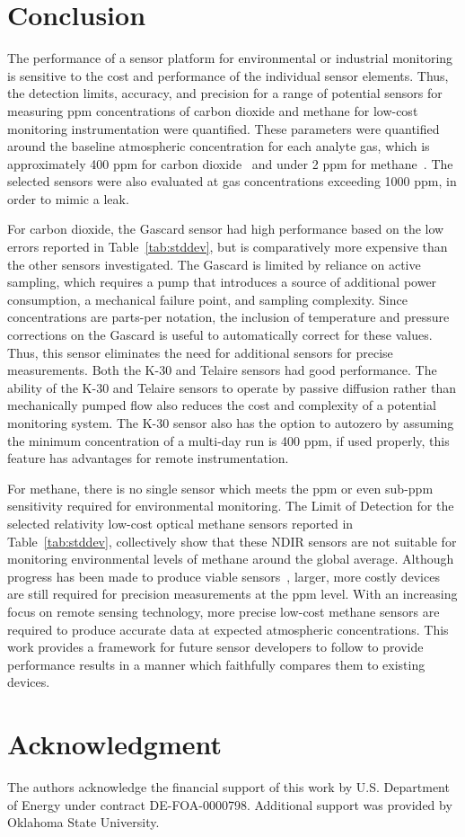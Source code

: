 \documentclass[preprint,sort&compress]{elsarticle}
\begin{document}
			\FloatBarrier	
	
	\section{Conclusion}
	
		The performance of a sensor platform for environmental or industrial monitoring is sensitive to the cost and performance of the individual sensor elements.  Thus, the detection limits, accuracy, and precision for a range of potential sensors for measuring ppm concentrations of carbon dioxide and methane for low-cost monitoring instrumentation were quantified.  These parameters were quantified around the baseline atmospheric concentration for each analyte gas, which is approximately 400 ppm for carbon dioxide~\cite{blasing_recent_2016,dlugokencky_trends_2016} and under 2 ppm for methane~\cite{turner_large_2016,bamberger_spatial_2014,dlugokencky_trends_2016-1}.  The selected sensors were also evaluated at gas concentrations exceeding 1000 ppm, in order to mimic a leak.
		
		For carbon dioxide, the Gascard sensor had high performance based on the low errors reported in Table~\ref{tab:stddev}, but is comparatively more expensive than the other sensors investigated.  The Gascard is limited by reliance on active sampling, which requires a pump that introduces a source of additional power consumption, a mechanical failure point, and sampling complexity.  Since concentrations are parts-per notation, the inclusion of temperature and pressure corrections on the Gascard is useful to automatically correct for these values.  Thus, this sensor eliminates the need for additional sensors for precise measurements.   Both the K-30 and Telaire sensors had good performance.  The ability of the K-30 and Telaire sensors to operate by passive diffusion rather than mechanically pumped flow also reduces the cost and complexity of a potential monitoring system.   The K-30 sensor also has the option to autozero by assuming the minimum concentration of a multi-day run is 400 ppm, if used properly, this feature has advantages for remote instrumentation.
		
		For methane, there is no single sensor which meets the ppm or even sub-ppm sensitivity required for environmental monitoring. The Limit of Detection for the selected relativity low-cost optical methane sensors reported in Table~\ref{tab:stddev}, collectively show that these NDIR sensors are not suitable for monitoring environmental levels of methane around the global average.  Although progress has been made to produce viable sensors~\cite{zhu_one_2012}, larger, more costly devices are still required for precision measurements at the ppm level.  With an increasing focus on remote sensing technology, more precise low-cost methane sensors are required to produce accurate data at expected atmospheric concentrations.  This work provides a framework for future sensor developers to follow to provide performance results in a manner which faithfully compares them to existing devices.
	
	\section*{Acknowledgment}
	
		The authors acknowledge the financial support of this work by U.S. Department of Energy under contract DE-FOA-0000798.  Additional support was provided by Oklahoma State University. 
	
	
	
	
\end{document}
